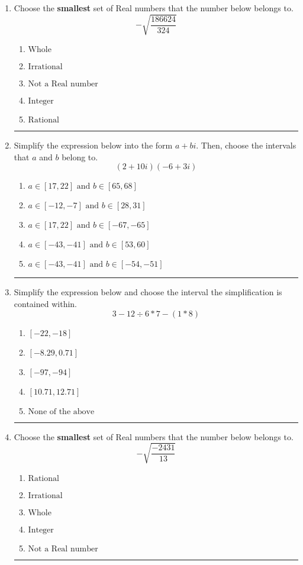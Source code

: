 \documentclass[14pt]{extbook}
\newcommand{\litem}[1]{\item#1\hspace*{-1cm}\rule{\textwidth}{0.4pt}}
\begin{document}
\begin{enumerate}
\litem{
Choose the \textbf{smallest} set of Real numbers that the number below belongs to.\[ -\sqrt{\frac{186624}{324}} \]\begin{enumerate}[label=\Alph*.]
\item \( \text{Whole} \)
\item \( \text{Irrational} \)
\item \( \text{Not a Real number} \)
\item \( \text{Integer} \)
\item \( \text{Rational} \)

\end{enumerate} }
\litem{
Simplify the expression below into the form $a+bi$. Then, choose the intervals that $a$ and $b$ belong to.\[ (2 + 10 i)(-6 + 3 i) \]\begin{enumerate}[label=\Alph*.]
\item \( a \in [17, 22] \text{ and } b \in [65, 68] \)
\item \( a \in [-12, -7] \text{ and } b \in [28, 31] \)
\item \( a \in [17, 22] \text{ and } b \in [-67, -65] \)
\item \( a \in [-43, -41] \text{ and } b \in [53, 60] \)
\item \( a \in [-43, -41] \text{ and } b \in [-54, -51] \)

\end{enumerate} }
\litem{
Simplify the expression below and choose the interval the simplification is contained within.\[ 3 - 12 \div 6 * 7 - (1 * 8) \]\begin{enumerate}[label=\Alph*.]
\item \( [-22, -18] \)
\item \( [-8.29, 0.71] \)
\item \( [-97, -94] \)
\item \( [10.71, 12.71] \)
\item \( \text{None of the above} \)

\end{enumerate} }
\litem{
Choose the \textbf{smallest} set of Real numbers that the number below belongs to.\[ -\sqrt{\frac{-2431}{13}} \]\begin{enumerate}[label=\Alph*.]
\item \( \text{Rational} \)
\item \( \text{Irrational} \)
\item \( \text{Whole} \)
\item \( \text{Integer} \)
\item \( \text{Not a Real number} \)


\end{enumerate}}
\end{enumerate}
\end{document}
